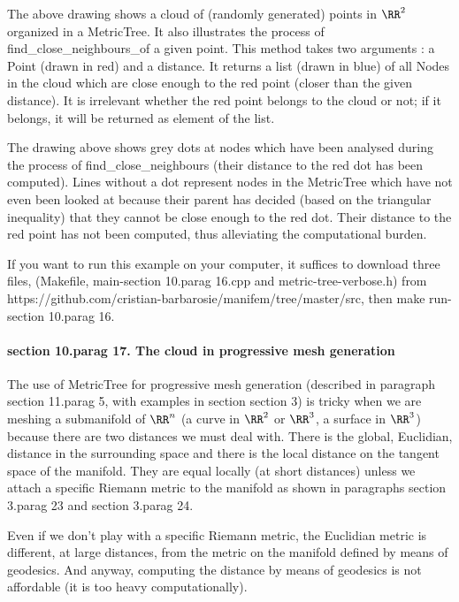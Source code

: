 The above drawing shows a cloud of (randomly generated) points in $ \RR^2 $ organized in a
{\codett MetricTree}.
It also illustrates the process of {\codett find\_close\_neighbours\_of} a given point.
This method takes two arguments : a {\codett Point} (drawn in red) and a distance.
It returns a list (drawn in blue) of all {\codett Node}s in the cloud which are close enough
to the red point (closer than the given distance).
It is irrelevant whether the red point belongs to the cloud or not;
if it belongs, it will be returned as element of the list.

The drawing above shows grey dots at nodes which have been analysed during the process of
{\codett find\_close\_neighbours} (their distance to the red dot has been computed).
Lines without a dot represent nodes in the {\codett MetricTree} which have not even been
looked at because their parent has decided (based on the triangular inequality)
that they cannot be close enough to the red dot.
Their distance to the red point has not been computed, thus alleviating the computational
burden.

If you want to run this example on your computer, it suffices to download three files,
({\codett Makefile}, {\codett main-\numb section 10.\numb parag 16.cpp} and
{\codett metric-tree-verbose.h})
from {\codett https://github.com/cristian-barbarosie/manifem/tree/master/src},
then {\codett make run-\numb section 10.\numb parag 16}.


\paragraph{\numb section 10.\numb parag 17. The cloud in progressive mesh generation}

The use of {\codett MetricTree} for progressive mesh generation (described in paragraph
\numb section 11.\numb parag 5, with examples in section \numb section 3)
is tricky when we are meshing a submanifold of $ \RR^n $
(a curve in $ \RR^2 $ or $ \RR^3 $, a surface in $ \RR^3 $)
because there are two distances we must deal with.
There is the global, Euclidian, distance in the surrounding space
and there is the local distance on the tangent space of the manifold.
They are equal locally (at short distances) unless we attach a specific Riemann metric
to the manifold as shown in paragraphs \numb section 3.\numb parag 23 and
\numb section 3.\numb parag 24.

Even if we don't play with a specific Riemann metric, the Euclidian metric is different,
at large distances, from the metric on the manifold defined by means of geodesics.
And anyway, computing the distance by means of geodesics is not affordable (it is too heavy
computationally).

